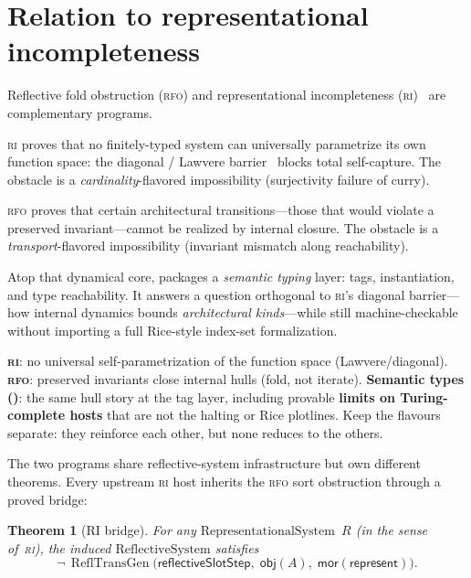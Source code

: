 \documentclass[11pt]{article}
\theoremstyle{plain}
\newtheorem{theorem}{Theorem}[section]
\theoremstyle{definition}
\theoremstyle{remark}
\newcommand{\RFO}{\textsc{rfo}}
\newcommand{\RI}{\textsc{ri}}
\newcommand{\ReflTransGen}{\operatorname{ReflTransGen}}
\newcommand{\obj}{\mathsf{obj}}
\newcommand{\mor}{\mathsf{mor}}
\newcommand{\represent}{\mathsf{represent}}
\begin{document}
\section{Relation to representational incompleteness}\label{sec:ri}

Reflective fold obstruction (\RFO) and representational incompleteness
(\RI)~\cite{spivack2026ri} are complementary programs.

\RI{} proves that no finitely-typed system can universally parametrize its own function
space: the diagonal / Lawvere barrier~\cite{lawvere1969} blocks total self-capture.  The
obstacle is a \emph{cardinality}-flavored impossibility (surjectivity failure of curry).

\RFO{} proves that certain architectural transitions---those that would violate a
preserved invariant---cannot be realized by internal closure.  The obstacle is a
\emph{transport}-flavored impossibility (invariant mismatch along reachability).

Atop that dynamical core,  packages a \emph{semantic typing}
layer: tags, instantiation, and type reachability.  It answers a question orthogonal to
\RI's diagonal barrier---how internal dynamics bounds \emph{architectural kinds}---while
still machine-checkable without importing a full Rice-style index-set formalization.

\begin{keybox}[title={Diagonal pressure vs.\ dynamical hull vs.\ semantic types}]
\textbf{\RI{}}: no universal self-parametrization of the function space (Lawvere/diagonal).
\textbf{\RFO{}}: preserved invariants close internal hulls (fold, not iterate).
\textbf{Semantic types ()}: the same hull story at the tag layer,
including provable \textbf{limits on Turing-complete hosts} that are not the halting
or Rice plotlines.  Keep the flavours separate: they reinforce each other, but none
reduces to the others.
\end{keybox}

The two programs share reflective-system infrastructure but own different theorems.
Every upstream \RI{} host inherits the \RFO{} sort obstruction through a proved
bridge:

\begin{theorem}[RI bridge]\label{thm:ri-bridge}
For any $\mathrm{RepresentationalSystem}$~$R$ (in the sense of~\RI{}), the induced
$\mathrm{ReflectiveSystem}$ satisfies
\[
  \lnot\, \ReflTransGen\bigl(\mathsf{reflectiveSlotStep},\;
  \obj(A),\; \mor(\represent)\bigr).
\]
\end{theorem}
\end{document}
